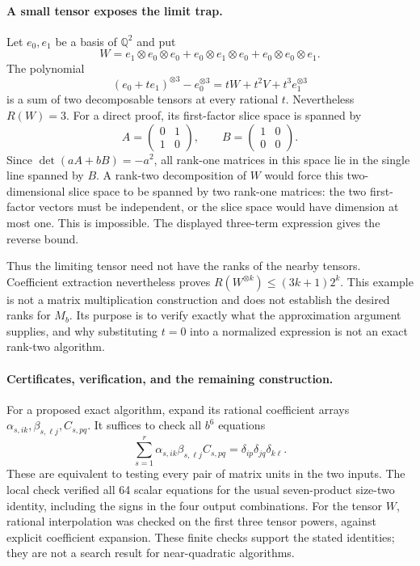 \documentclass[11pt]{article}
\begin{document}
\paragraph{A small tensor exposes the limit trap.}
Let $e_0,e_1$ be a basis of $\mathbb Q^2$ and put
\[
 W=e_1\otimes e_0\otimes e_0+
   e_0\otimes e_1\otimes e_0+
   e_0\otimes e_0\otimes e_1.
\]
The polynomial
\[
 (e_0+te_1)^{\otimes3}-e_0^{\otimes3}
       =tW+t^2V+t^3e_1^{\otimes3}
\]
is a sum of two decomposable tensors at every rational $t$.
Nevertheless $R(W)=3$. For a direct proof, its first-factor slice space
is spanned by
\[
 A=\begin{pmatrix}0&1\\1&0\end{pmatrix},\qquad
 B=\begin{pmatrix}1&0\\0&0\end{pmatrix}.
\]
Since $\det(aA+bB)=-a^2$, all rank-one matrices in this space lie in
the single line spanned by $B$. A rank-two decomposition of $W$ would
force this two-dimensional slice space to be spanned by two rank-one
matrices: the two first-factor vectors must be independent, or the
slice space would have dimension at most one. This is impossible.
The displayed three-term expression gives the reverse bound.

Thus the limiting tensor need not have the ranks of the nearby tensors.
Coefficient extraction nevertheless proves
$R(W^{\otimes k})\le(3k+1)2^k$. This example is not a matrix
multiplication construction and does not establish the desired ranks
for $M_b$. Its purpose is to verify exactly what the approximation
argument supplies, and why substituting $t=0$ into a normalized
expression is not an exact rank-two algorithm.

\paragraph{Certificates, verification, and the remaining construction.}
For a proposed exact algorithm, expand its rational coefficient arrays
$\alpha_{s,ik},\beta_{s,\ell j},C_{s,pq}$. It suffices to check all
$b^6$ equations
\[
 \sum_{s=1}^r\alpha_{s,ik}\beta_{s,\ell j}C_{s,pq}
       =\delta_{ip}\delta_{jq}\delta_{k\ell}.
\]
These are equivalent to testing every pair of matrix units in the two
inputs. The local check verified all 64 scalar equations for the usual
seven-product size-two identity, including the signs in the four output
combinations. For the tensor $W$, rational interpolation was checked on
the first three tensor powers, against explicit coefficient expansion.
These finite checks support the stated identities; they are not a
search result for near-quadratic algorithms.
\end{document}
